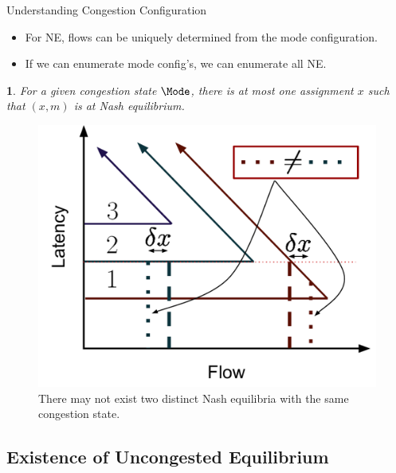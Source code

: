 \documentclass[english, smaller]{beamer}
\theoremstyle{plain}
\theoremstyle{definition}
\theoremstyle{plain}
\newtheorem{lem}[thm]{\protect\lemmaname}
\theoremstyle{plain}
\providecommand{\lemmaname}{Lemma}
\begin{document}
\begin{frame}{Understanding Congestion Configuration}
\begin{itemize}
\item For NE, flows can be uniquely determined from the mode configuration. 
\item If we can enumerate mode config's, we can enumerate all NE.\end{itemize}
\begin{lem}
\label{lem:uniquemode}For a given congestion state $\Mode$, there
is at most one assignment $x$ such that $(x,m)$ is at Nash equilibrium.
\end{lem}
\begin{figure}
\begin{centering}
\includegraphics[scale=0.25]{../../figures/presentation/LemmaUniqueFlowFromMode}
\par\end{centering}

\caption{There may not exist two distinct Nash equilibria with the same congestion
state.}
\end{figure}



\end{frame}

\subsection{Existence of Uncongested Equilibrium}
\end{document}
